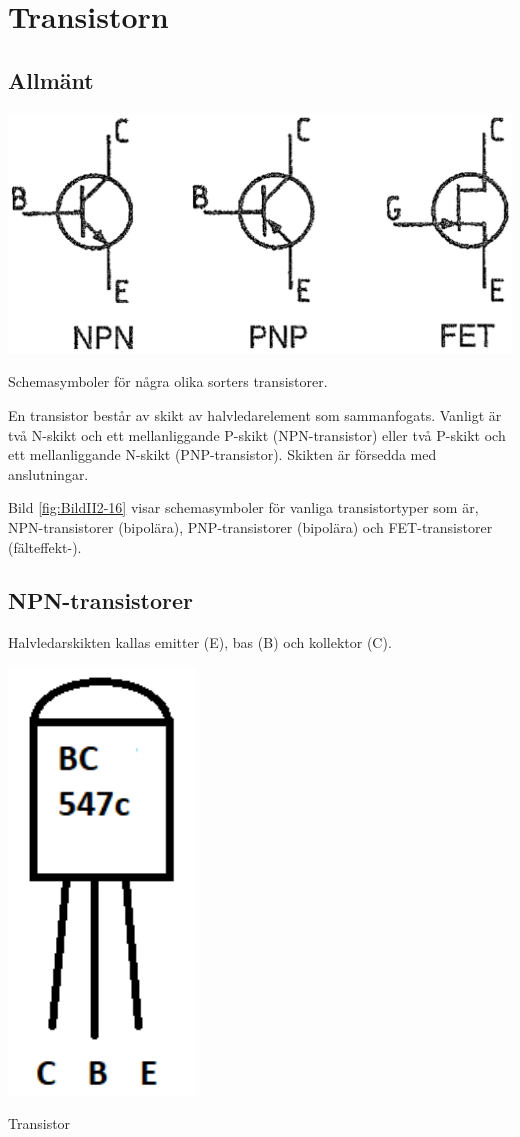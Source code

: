 \section{Transistorn}
\label{transistorn}

\subsection{Allmänt}

\begin{marginfigure}
\includegraphics[width=\textwidth]{images/cropped_pdfs/bild_2_2-16.pdf}
\caption{Schemasymboler för några olika sorters transistorer.}
\label{fig:BildII2-16}
\end{marginfigure}

En transistor består av skikt av halvledarelement som sammanfogats.
Vanligt är två N-skikt och ett mellanliggande P-skikt (NPN-transistor) eller
två P-skikt och ett mellanliggande N-skikt (PNP-transistor).
Skikten är försedda med anslutningar.

Bild \ref{fig:BildII2-16} visar schemasymboler för vanliga transistortyper 
som är, NPN-transistorer (bipolära), PNP-transistorer (bipolära) och
FET-transistorer (fälteffekt-).

\subsection{NPN-transistorer}

Halvledarskikten kallas emitter (E), bas (B) och kollektor (C).

\begin{marginfigure}
\includegraphics[width=.15\textwidth]{images/cropped_pdfs/bild_2_6-37.pdf}
\caption{Transistor}
\label{fig:BildII2-17a}
\end{marginfigure}

